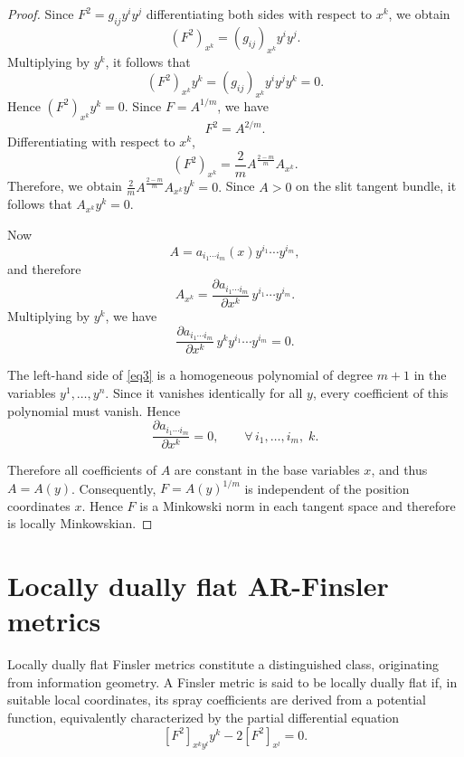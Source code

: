 \documentclass[12pt]{article}
\theoremstyle{definition}
\begin{document}
					\begin{proof}
						Since $F^2=g_{ij}y^iy^j$ differentiating both sides with respect to \(x^k\), we obtain
						\[
						(F^2)_{x^k}=(g_{ij})_{x^k}y^iy^j.
						\]
						Multiplying by \(y^k\), it follows that
						\[
						(F^2)_{x^k}y^k=(g_{ij})_{x^k}y^iy^jy^k=0.
						\]
						Hence $(F^2)_{x^k}y^k=0.$ Since $F=A^{1/m}$,
						we have
						\[
						F^2=A^{2/m}.
						\]
						Differentiating with respect to \(x^k\),
						\[
						(F^2)_{x^k}
						=
						\frac{2}{m}A^{\frac{2-m}{m}}A_{x^k}.
						\]
						Therefore, we obtain $\frac{2}{m}A^{\frac{2-m}{m}}A_{x^k}y^k=0.$
						Since \(A>0\) on the slit tangent bundle, it follows that $A_{x^k}y^k=0.$
						
						Now
						\[
						A=a_{i_1\cdots i_m}(x)y^{i_1}\cdots y^{i_m},
						\]
						and therefore
						\[
						A_{x^k}
						=
						\frac{\partial a_{i_1\cdots i_m}}{\partial x^k}
						\,y^{i_1}\cdots y^{i_m}.
						\]
						Multiplying by \(y^k\), we have
						\begin{equation}\label{eq3}
						\frac{\partial a_{i_1\cdots i_m}}{\partial x^k}
						\,y^k y^{i_1}\cdots y^{i_m}=0.    
						\end{equation}
						
						
						The left-hand side of \eqref{eq3} is a homogeneous polynomial of degree
						\(m+1\) in the variables \(y^1,\ldots,y^n\). Since it vanishes
						identically for all \(y\), every coefficient of this polynomial must vanish. Hence
						\[
						\frac{\partial a_{i_1\cdots i_m}}{\partial x^k}=0,
						\qquad
						\forall\, i_1,\ldots,i_m,\; k.
						\]
						
						Therefore all coefficients of \(A\) are constant in the base variables \(x\), and thus $A=A(y)$. Consequently, $F=A(y)^{1/m}$
						is independent of the position coordinates \(x\). Hence \(F\) is a Minkowski norm in each tangent space and therefore is locally Minkowskian.
					\end{proof}
					
					\section{Locally dually flat AR-Finsler metrics}\label{sec:dually-flat-AR}
					Locally dually flat Finsler metrics constitute a  distinguished class, originating from information geometry. A Finsler metric is said to be locally dually flat if, in suitable local coordinates, its spray coefficients are derived from a potential function, equivalently characterized by the partial differential equation \begin{equation}\label{eq22}
					[F^2]_{x^k y^l} y^k - 2[F^2]_{x^l} = 0.
					\end{equation}
					
\end{document}
